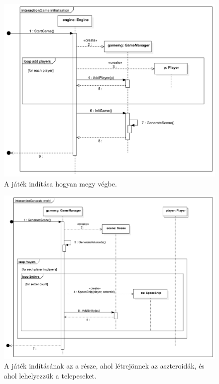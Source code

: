 \begin{figure}[H] 
\centering 
\includegraphics[width=1\textwidth]{docs/3_Project/svg/Design Model!Game Init!Game initialization!Game initialization_25.png} 
\caption{A játék indítása hogyan megy végbe.} 
\end{figure} 

\begin{figure}[H] 
\centering 
\includegraphics[width=1\textwidth]{docs/3_Project/svg/Design Model!Game Init!Generate world!Generate world_26.png} 
\caption{A játék indításának az a része, ahol létrejönnek az aszteroidák, és ahol lehelyezzük a telepeseket.} 
\end{figure} 

